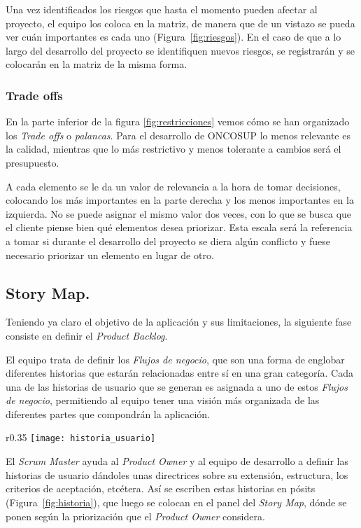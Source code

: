 Una vez identificados los riesgos que hasta el momento pueden afectar al proyecto, el equipo los coloca en la matriz, de manera que de un vistazo se pueda ver cuán importantes es cada uno (Figura~\ref{fig:riesgos}). En el caso de que a lo largo del desarrollo del proyecto se identifiquen nuevos riesgos, se registrarán y se colocarán en la matriz de la misma forma.

\subsubsection{Trade offs}
\label{subsubsec:tradeOffs}

En la parte inferior de la figura \ref{fig:restricciones} vemos cómo se han organizado los \emph{Trade offs} o \emph{palancas}. Para el desarrollo de ONCOSUP lo menos relevante es la calidad, mientras que lo más restrictivo y menos tolerante a cambios será el presupuesto.

A cada elemento se le da un valor de relevancia a la hora de tomar decisiones, colocando los más importantes en la parte derecha y los menos importantes en la izquierda. No se puede asignar el mismo valor dos veces, con lo que se busca que el cliente piense bien qué elementos desea priorizar. Esta escala será la referencia a tomar si durante el desarrollo del proyecto se diera algún conflicto y fuese necesario priorizar un elemento en lugar de otro.


\subsection{Story Map.}
\label{subsec:storyMap}

Teniendo ya claro el objetivo de la aplicación y sus limitaciones, la siguiente fase consiste en definir el \emph{Product Backlog}. 

El equipo trata de definir los \emph{Flujos de negocio}, que son una forma de englobar diferentes historias que estarán relacionadas entre sí en una gran categoría. Cada una de las historias de usuario que se generan es asignada a uno de estos \emph{Flujos de negocio}, permitiendo al equipo tener una visión más organizada de las diferentes partes que compondrán la aplicación. 

\begin{wrapfigure}{r}{0.35\textwidth} %
    \centering
    \texttt{[image: historia\_usuario]}
    \caption{Ejemplo de una Historia de Usuario}
    \label{fig:historia}
\end{wrapfigure}
El \emph{Scrum Master} ayuda al \emph{Product Owner} y al equipo de desarrollo a definir las historias de usuario dándoles unas directrices sobre su extensión, estructura, los criterios de aceptación, etcétera. Así se escriben estas historias en pósits (Figura~\ref{fig:historia}), que luego se colocan en el panel del \emph{Story Map}, dónde se ponen según la priorización que el \emph{Product Owner} considera.

